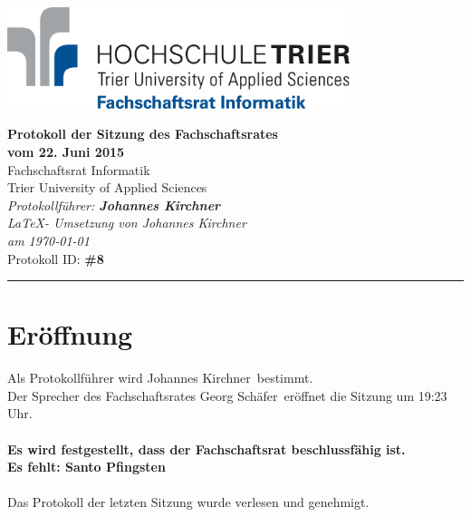 \documentclass[a4paper, 11pt]{article} %
\newcounter{summe}
\newcommand{\abstimmung}[4]{
	\setcounter{summe}{#3}
	\addtocounter{summe}{#4}
	\begin{flushleft}
		#1\\
	Es wird über den Antrag abgestimmt.
	\end{flushleft}
	\ifthenelse{\equal{#3}{0}\AND\equal{#4}{0}}{
	\begin{center}
		\textbf{Der Antrag wird einstimmig angenommen.}
	\end{center}
	}{
	\begin{center}
		#2 \ifthenelse{\equal{#2}{1}}{Stimme}{Stimmen} dafür, #3 \ifthenelse{\equal{#3}{1}}{Stimme}{Stimmen} dagegen, #4 \ifthenelse{\equal{#42}{1}}{Enthaltung}{Enthaltungen}\\
		\ifthenelse{#2>\value{summe}}{
		\textbf{Der Antrag ist somit angenommen.}
		}{
		\textbf{Der Antrag ist somit abgelehnt.}
		}
	\end{center}
	}
}
\newcommand{\protokoller}{Johannes Kirchner}
\newcommand{\dateOfMeeting}{22. Juni 2015}
\newcommand{\TeXer}{Johannes Kirchner}
\newcommand{\fsiPresident}{Georg Schäfer}
\newcommand{\protocolID}{8}
\begin{document}

\doublespacing
\thispagestyle{empty}

\begin{center}
\includegraphics[width=10.0cm]{../logo_fsi.eps}

\vspace*{\fill}
{\LARGE \textbf{Protokoll der Sitzung des Fachschaftsrates \\vom \dateOfMeeting}}\\
Fachschaftsrat Informatik\\
Trier University of Applied Sciences\\
\vspace{2.5cm}
\textit{
	Protokollführer: \textbf{\protokoller} \\
	\LaTeX - Umsetzung von \TeXer\\
	am \today\\
}
Protokoll ID: \textbf{\#\protocolID}
\vfill
\end{center}

\hspace*{-35cm}
\textcolor{fsi}{\rule{64.9cm}{15pt}}
\pagebreak

\setcounter{tocdepth}{2}
\tableofcontents
\pagebreak

\section{Eröffnung}
Als Protokollführer wird \protokoller~bestimmt.\\
Der Sprecher des Fachschaftsrates \fsiPresident~eröffnet die Sitzung um 19:23 Uhr.
\\\\
\textbf{Es wird festgestellt, dass der Fachschaftsrat beschlussfähig ist.}\\
\textbf{Es fehlt: Santo Pfingsten}
\\\\
Das Protokoll der letzten Sitzung wurde verlesen und genehmigt.

\end{document}

